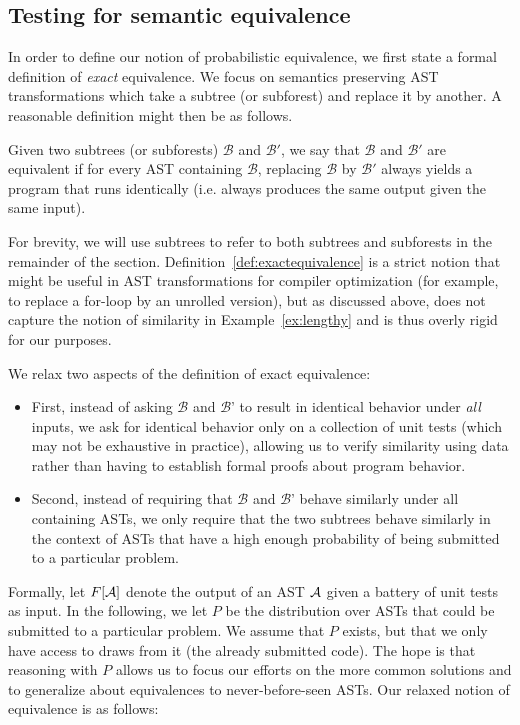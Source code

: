 \subsection{Testing for semantic equivalence}\label{sec:testing}
In order to define our notion of probabilistic equivalence, we first state a formal definition of \emph{exact} equivalence.
We focus on semantics preserving AST transformations which take a subtree (or subforest) and replace it by another.
A reasonable definition might then be as follows. 
\begin{defn}\label{def:exactequivalence}
Given two subtrees (or subforests) $\mathcal{B}$ and $\mathcal{B}'$,
we say that $\mathcal{B}$ and $\mathcal{B}'$ are equivalent if for every AST containing $\mathcal{B}$,
replacing $\mathcal{B}$ by $\mathcal{B}'$ always
yields a program that runs identically (i.e. always produces the same output given the same input).  
\end{defn}
For brevity, we will use subtrees to refer to both subtrees and subforests in the remainder of the section.
Definition~\ref{def:exactequivalence} is a strict notion that might be useful in AST transformations for compiler optimization 
(for example, to replace a for-loop by an unrolled version), but as discussed above, does not capture the notion of
similarity in Example~\ref{ex:lengthy} and is thus overly rigid for our purposes.

We relax two aspects of the definition of exact equivalence:
\begin{itemize}
\item First, instead of asking $\mathcal{B}$ and $\mathcal{B}$' to result in identical behavior under \emph{all} inputs, we ask for 
identical behavior only on a collection of unit tests (which may not be exhaustive in practice), allowing us to verify similarity using data 
rather than having to establish formal proofs about program behavior.
\item Second, instead of requiring that $\mathcal{B}$ and $\mathcal{B}$'  behave similarly under all containing ASTs, 
we only require that the two subtrees behave similarly in the context of ASTs that have a high enough probability of being submitted to a particular problem.	
\end{itemize}
Formally, let $F[\mathcal{A}]$ denote the output of an AST $\mathcal{A}$ given a battery of unit tests as input.
In the following, we let $P$ be the distribution over ASTs that could be submitted to a particular problem.
We assume that $P$ exists, but that we only have access to draws from it (the already submitted code).
The hope is that reasoning with $P$ allows us to focus our efforts on the more common solutions and to generalize 
about equivalences to never-before-seen ASTs.  Our relaxed notion of equivalence is as follows:

